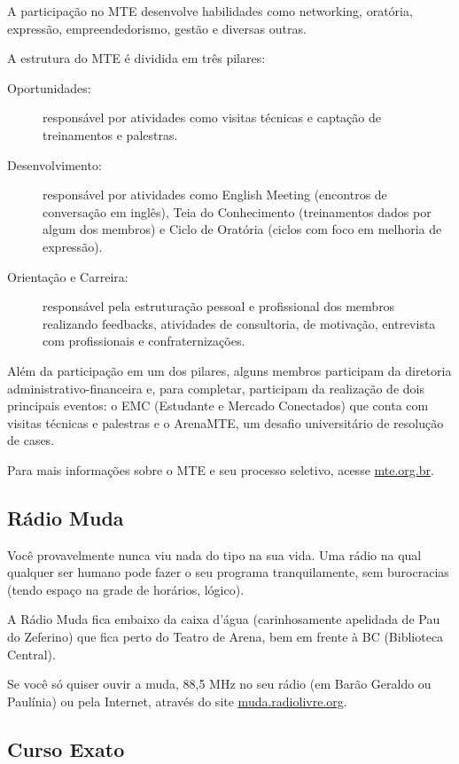 A participação no MTE desenvolve habilidades como networking, oratória,
expressão, empreendedorismo, gestão e diversas outras.

A estrutura do MTE é dividida em três pilares:

\begin{description}
    \item[Oportunidades:] responsável por atividades como visitas técnicas e
        captação de treinamentos e palestras.

    \item[Desenvolvimento:] responsável por atividades como English Meeting
        (encontros de conversação em inglês), Teia do Conhecimento (treinamentos
        dados por algum dos membros) e Ciclo de Oratória (ciclos com foco em
        melhoria de expressão).

    \item[Orientação e Carreira:] responsável pela estruturação pessoal e
        profissional dos membros realizando feedbacks, atividades de
        consultoria, de motivação, entrevista com profissionais e
        confraternizações.
\end{description}

Além da participação em um dos pilares, alguns membros participam da diretoria
administrativo-financeira e, para completar, participam da realização de dois
principais eventos: o EMC (Estudante e Mercado Conectados) que conta com visitas
técnicas e palestras e o ArenaMTE, um desafio universitário de resolução de
cases.

Para mais informações sobre o MTE e seu processo seletivo, acesse
\url{mte.org.br}.

\subsection{Rádio Muda}

Você provavelmente nunca viu nada do tipo na sua vida. Uma rádio na qual
qualquer ser humano pode fazer o seu programa tranquilamente, sem burocracias
(tendo espaço na grade de horários, lógico).

A Rádio Muda fica embaixo da caixa d'água (carinhosamente apelidada de Pau do
Zeferino) que fica perto do Teatro de Arena, bem em frente à BC (Biblioteca
Central).

Se você só quiser ouvir a muda, 88,5 MHz no seu rádio (em Barão Geraldo ou
Paulínia) ou pela Internet, através do site \url{muda.radiolivre.org}.

\subsection{Curso Exato}

